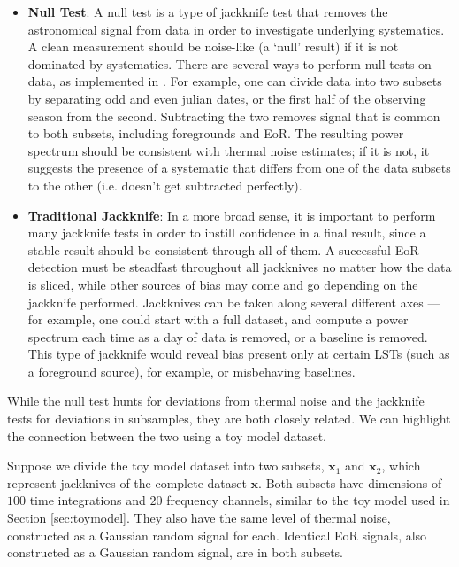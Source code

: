 \documentclass[preprint2,numberedappendix,tighten]{aastex6}  %
\begin{document}
\begin{itemize}
\item \textbf{Null Test}: A null test is a type of jackknife test that removes the astronomical signal from data in order to investigate underlying systematics. A clean measurement should be noise-like (a `null' result) if it is not dominated by systematics. There are several ways to perform null tests on data, as implemented in \citet{keating_et_al2016}. For example, one can divide data into two subsets by separating odd and even julian dates, or the first half of the observing season from the second. Subtracting the two removes signal that is common to both subsets, including foregrounds and EoR. The resulting power spectrum should be consistent with thermal noise estimates; if it is not, it suggests the presence of a systematic that differs from one of the data subsets to the other (i.e. doesn't get subtracted perfectly). 
\item \textbf{Traditional Jackknife}: In a more broad sense, it is important to perform many jackknife tests in order to instill confidence in a final result, since a stable result should be consistent through all of them. A successful EoR detection must be steadfast throughout all jackknives no matter how the data is sliced, while other sources of bias may come and go depending on the jackknife performed. Jackknives can be taken along several different axes --- for example, one could start with a full dataset, and compute a power spectrum each time as a day of data is removed, or a baseline is removed. This type of jackknife would reveal bias present only at certain LSTs (such as a foreground source), for example, or misbehaving baselines.
\end{itemize}

While the null test hunts for deviations from thermal noise and the jackknife tests for deviations in subsamples, they are both closely related. We can highlight the connection between the two using a toy model dataset.

Suppose we divide the toy model dataset into two subsets, $\textbf{x}_{1}$ and $\textbf{x}_{2}$, which represent jackknives of the complete dataset $\textbf{x}$.  Both subsets have dimensions of $100$ time integrations and $20$ frequency channels, similar to the toy model used in Section \ref{sec:toymodel}. They also have the same level of thermal noise, constructed as a Gaussian random signal for each. Identical EoR signals, also constructed as a Gaussian random signal, are in both subsets.
\end{document}
